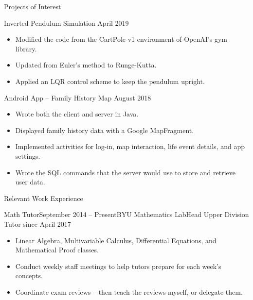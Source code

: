 \documentclass{resume}
\begin{document}
\begin{rSection}{Projects of Interest}
    
    Inverted Pendulum Simulation \hfill April 2019
    \begin{itemize}[noitemsep, topsep=-6pt, label = $\cdot$]
        \item Modified the code from the CartPole-v1 environment of OpenAI's gym library.
        \item Updated from Euler's method to Runge-Kutta.
        \item Applied an LQR control scheme to keep the pendulum upright.
    \end{itemize}
    \vspace{1ex}
    Android App -- Family History Map \hfill August 2018
    \begin{itemize}[noitemsep, topsep=-6pt, label = $\cdot$]
        \item Wrote both the client and server in Java.
        \item Displayed family history data with a Google MapFragment.
        \item Implemented activities for log-in, map interaction, life event details, and app settings.
        \item Wrote the SQL commands that the server would use to store and retrieve user data.
    \end{itemize}

\end{rSection}

\begin{rSection}{Relevant Work Experience}
    \begin{rSubsection}
        {Math Tutor}{September 2014 -- Present}{BYU Mathematics Lab}{Head Upper Division Tutor since April 2017}
    \end{rSubsection}
    \begin{itemize}[topsep=-7pt, noitemsep, label = $\cdot$]
        \item Linear Algebra, Multivariable Calculus, Differential Equations, and Mathematical Proof classes.
        \item Conduct weekly staff meetings to help tutors prepare for each week's concepts.
        \item Coordinate exam reviews -- then teach the reviews myself, or delegate them.
    \end{itemize}
\end{rSection}
\end{document}
